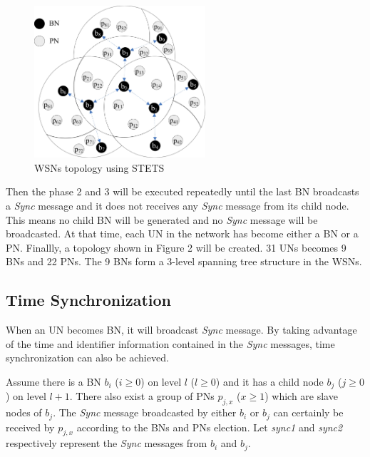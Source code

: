 \documentclass[runningheads,a4paper]{llncs}
\begin{document}
\begin{figure}[h]
\centering
\includegraphics[width=2.5in]{fig2.jpg}
\caption{WSNs topology using STETS}
\label{fig_sim}
\end{figure}

Then the phase 2 and 3 will be executed repeatedly until the last BN broadcasts a \textit{Sync} message and it does not receives any \textit{Sync} message from its child node. This means no child BN will be generated and no \textit{Sync} message will be broadcasted. At that time, each UN in the network has become either a BN or a PN. Finallly, a topology shown in Figure 2 will be created. 31 UNs becomes 9 BNs and 22 PNs. The 9 BNs form a 3-level spanning tree structure in the WSNs.





\subsection{Time Synchronization}
When an UN becomes BN, it will broadcast \textit{Sync} message. By taking advantage of the time and identifier information contained in the \textit{Sync} messages, time synchronization can also be achieved.

Assume there is a BN $ b_{i}$ ($i\geq 0 $) on level $l$ ($l\geq 0 $) and it has a child node $b_{j}$ ($j\geq 0 $) on level $l+1$. There also exist a group of PNs $p_{j,x}$ ($x\geq 1 $) which are slave nodes of $b_{j}$. The \textit{Sync} message broadcasted by either $b_{i}$ or $b_{j}$ can certainly be received by $p_{j,x}$ according to the BNs and PNs election. Let \textit{sync1} and \textit{sync2} respectively represent the \textit{Sync} messages from $b_{i}$ and $b_{j}$.
\end{document}
